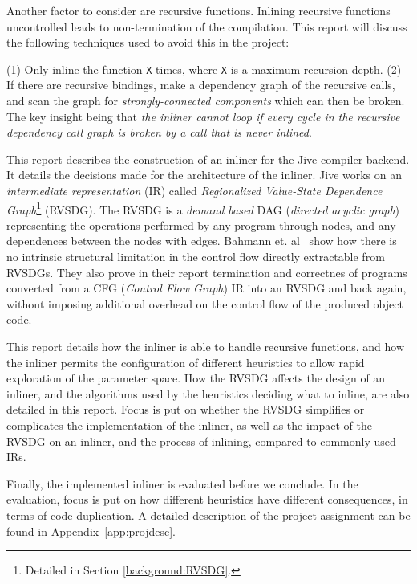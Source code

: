 Another factor to consider are recursive functions. Inlining recursive functions
uncontrolled leads to non-termination of the compilation. This report will
discuss the following techniques used to avoid this in the project:

(1) Only inline the function \lstinline!X! times, where \lstinline!X! is a
maximum recursion depth\cite{GHCPaper}\cite{InlineWhenHowSerrano}. (2) If there
are recursive bindings, make a dependency graph of the recursive calls, and scan
the graph for \textit {strongly-connected components} which can then be broken.
The key insight being that \textit{the inliner cannot loop if every cycle in the
recursive dependency call graph is broken by a call that is never
inlined}\cite{BasMscThesis}\cite{GHCPaper}.

This report describes the construction of an inliner for the Jive compiler
backend. It details the decisions made for the architecture of the inliner. Jive
works on an \textit{intermediate representation} (IR) called
\textit{Regionalized Value-State Dependence Graph}\footnote{Detailed in Section
\ref{background:RVSDG}.} (RVSDG). The RVSDG is a \textit{demand based} DAG
(\textit{directed acyclic graph}) representing the operations performed by any
program through nodes, and any dependences between the nodes with
edges. Bahmann et. al~\cite{RVSDG:HiPEACpaper} show how there is no intrinsic
structural limitation in the control flow directly extractable from RVSDGs. They
also prove in their report termination and correctnes of programs converted from
a CFG (\textit{Control Flow Graph}) IR into an RVSDG and back again, without
imposing additional overhead on the control flow of the produced object code.


This report details how the inliner is able to handle recursive functions, and
how the inliner permits the configuration of different heuristics to allow rapid
exploration of the parameter space. How the RVSDG affects the design of an
inliner, and the algorithms used by the heuristics deciding what to inline, are
also detailed in this report. Focus is put on whether the RVSDG simplifies or
complicates the implementation of the inliner, as well as the impact of the
RVSDG on an inliner, and the process of inlining, compared to commonly used IRs.

Finally, the implemented inliner is evaluated before we conclude. In the
evaluation, focus is put on how different heuristics have different
consequences, in terms of code-duplication. A detailed description of the
project assignment can be found in Appendix~\ref{app:projdesc}.
